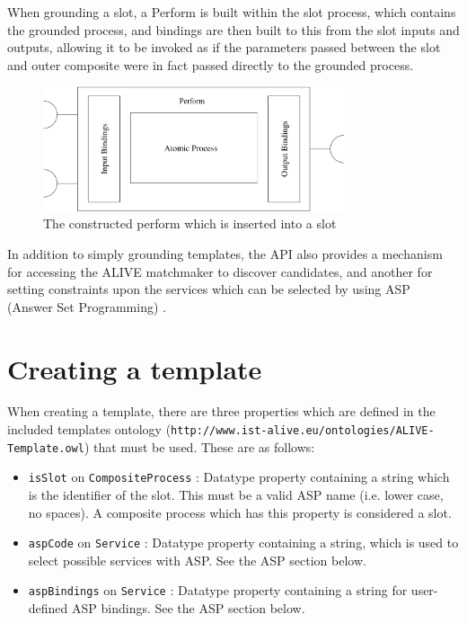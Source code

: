 \documentclass{llncs}
\begin{document}
 When grounding a slot, a Perform is built within the slot process, which 
 contains the grounded process, and bindings are then built to this from the 
 slot inputs and outputs, allowing it to be invoked as if the parameters passed 
 between the slot and outer composite were in fact passed directly to the 
 grounded process.

\begin{figure}[htb]
\vspace{-15pt}
\begin{center}
\includegraphics[width=3.5in]{perform}
\caption{The constructed perform which is inserted into a slot}
\end{center}
\vspace{-25pt}
\end{figure}

 In addition to simply grounding templates, the API also provides a mechanism 
 for accessing the ALIVE matchmaker to discover candidates, and another for 
 setting constraints upon the services which can be selected by using ASP 
 (Answer Set Programming) \cite{potassco}.

\section{Creating a template}
 When creating a template, there are three properties which are defined 
 in the included templates ontology
 (\texttt{http://www.ist-alive.eu/ontologies/ALIVE-Template.owl}) that 
 must be used. These are as follows:
 \begin{itemize}
 	\item \texttt{isSlot} on \texttt{CompositeProcess} : Datatype property 
 		containing a string which is the identifier of the slot. This
 		must be a valid ASP name (i.e. lower case, no spaces). A 
 		composite process which has this property is considered a slot.
 	\item \texttt{aspCode} on \texttt{Service} : Datatype property containing 
 		a string, which is used to select possible services with ASP. See 
 		the ASP section below.
 	\item \texttt{aspBindings} on \texttt{Service} : Datatype property containing 
 		a string for user-defined ASP bindings. See the ASP section below.
 \end{itemize}
\end{document}
